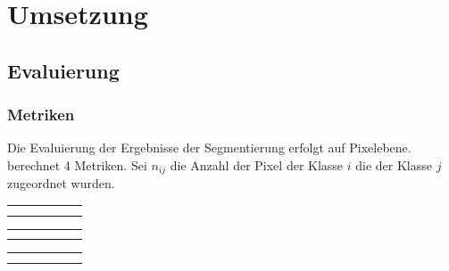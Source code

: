 \chapter{Umsetzung}

\section{Evaluierung}


\subsection{Metriken}
Die Evaluierung der Ergebnisse der Segmentierung erfolgt auf Pixelebene.
\cite{LongFullyconvolutionalnetworks2015} berechnet 4 Metriken.
Sei \(n_{ij}\) die Anzahl der Pixel der Klasse \(i\) die der Klasse \(j\) zugeordnet wurden.


\newcommand{\resulttable}[3]{
    \begin{tabular}{l|r|r|r|r|r}%
    \hline
        \csvreader[head to column names, filter equal={\dataset}{#2}]{#1}{}%
        {#3}
        \end{tabular}
}
\begin{table}
    \resulttable{results/document_image_segmentation_results.csv}{CB55}{ \name & \pixelacc & \FgPA & \meanacc & \meanIU & \fwIU\\}
    \resulttable{results/document_image_segmentation_results.csv}{CSG18}{  \pixelacc & \FgPA & \meanacc & \meanIU & \fwIU\\}
    \resulttable{results/document_image_segmentation_results.csv}{CSG863}{  \pixelacc & \FgPA & \meanacc & \meanIU & \fwIU\\}
        
\end{table}

